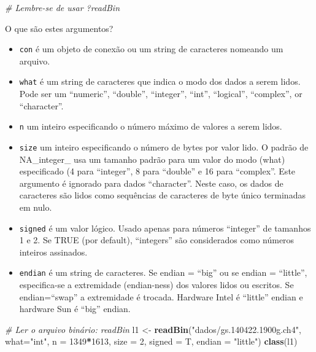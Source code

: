 \documentclass[]{book}
\newenvironment{Shaded}{\begin{snugshade}}{\end{snugshade}}
\newcommand{\KeywordTok}[1]{\textcolor[rgb]{0.13,0.29,0.53}{\textbf{#1}}}
\newcommand{\DataTypeTok}[1]{\textcolor[rgb]{0.13,0.29,0.53}{#1}}
\newcommand{\DecValTok}[1]{\textcolor[rgb]{0.00,0.00,0.81}{#1}}
\newcommand{\StringTok}[1]{\textcolor[rgb]{0.31,0.60,0.02}{#1}}
\newcommand{\CommentTok}[1]{\textcolor[rgb]{0.56,0.35,0.01}{\textit{#1}}}
\newcommand{\OperatorTok}[1]{\textcolor[rgb]{0.81,0.36,0.00}{\textbf{#1}}}
\newcommand{\NormalTok}[1]{#1}
\providecommand{\tightlist}{%
  \setlength{\itemsep}{0pt}\setlength{\parskip}{0pt}}
\theoremstyle{definition}
\theoremstyle{definition}
\theoremstyle{definition}
\theoremstyle{remark}
\begin{document}
\begin{Shaded}
\begin{Highlighting}[]
\CommentTok{# Lembre-se de usar ?readBin}
\end{Highlighting}
\end{Shaded}

O que são estes argumentos?

\begin{itemize}
\tightlist
\item
  \texttt{con} é um objeto de conexão ou um string de caracteres
  nomeando um arquivo.
\item
  \texttt{what} é um string de caracteres que indica o modo dos dados a
  serem lidos. Pode ser um ``numeric'', ``double'', ``integer'',
  ``int'', ``logical'', ``complex'', or ``character''.
\item
  \texttt{n} um inteiro especificando o número máximo de valores a serem
  lidos.
\item
  \texttt{size} um inteiro especificando o número de bytes por valor
  lido. O padrão de NA\_integer\_ usa um tamanho padrão para um valor do
  modo (what) especificado (4 para ``integer'', 8 para ``double'' e 16
  para ``complex''. Este argumento é ignorado para dados ``character''.
  Neste caso, os dados de caracteres são lidos como sequências de
  caracteres de byte único terminadas em nulo.
\item
  \texttt{signed} é um valor lógico. Usado apenas para números
  ``integer'' de tamanhos 1 e 2. Se TRUE (por default), ``integers'' são
  considerados como números inteiros assinados.
\item
  \texttt{endian} é um string de caracteres. Se endian = ``big'' ou se
  endian = ``little'', especifica-se a extremidade (endian-ness) dos
  valores lidos ou escritos. Se endian=``swap'' a extremidade é trocada.
  Hardware Intel é ``little'' endian e hardware Sun é ``big'' endian.
\end{itemize}

\begin{Shaded}
\begin{Highlighting}[]
\CommentTok{# Ler o arquivo binário: readBin}
\NormalTok{l1 <-}\StringTok{ }\KeywordTok{readBin}\NormalTok{(}\StringTok{"dados/gs.140422.1900g.ch4"}\NormalTok{, }
              \DataTypeTok{what=}\StringTok{"int"}\NormalTok{, }
              \DataTypeTok{n =} \DecValTok{1349}\OperatorTok{*}\DecValTok{1613}\NormalTok{,}
              \DataTypeTok{size =} \DecValTok{2}\NormalTok{,}
              \DataTypeTok{signed =}\NormalTok{ T,}
              \DataTypeTok{endian =} \StringTok{"little"}\NormalTok{)}
\KeywordTok{class}\NormalTok{(l1)}
\end{Highlighting}
\end{Shaded}
\end{document}
